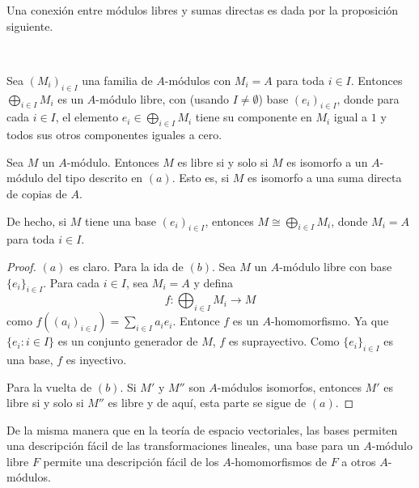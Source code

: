 Una conexión entre módulos libres y sumas directas es dada por la proposición siguiente.

\begin{proposition}~
  \begin{subtheorem}
    \item Sea $(M_i)_{i \in I}$ una familia de $A$-módulos con $M_i = A$ para toda $i \in I$. Entonces $\bigoplus_{i\in I} M_i$ es un $A$-módulo libre, con (usando $I \neq \emptyset$) base $(e_i)_{i \in I}$, donde para cada $i \in I$, el elemento $e_i \in \bigoplus_{i\in I} M_i$ tiene su componente en $M_i$ igual a $1$ y todos sus otros componentes iguales a cero.
    
    \item Sea $M$ un $A$-módulo. Entonces $M$ es libre si y solo si $M$ es isomorfo a un $A$-módulo del tipo descrito en $(a)$. Esto es, si $M$ es isomorfo a una suma directa de copias de $A$.
    
    De hecho, si $M$ tiene una base $(e_i)_{i \in I}$, entonces $M \cong \bigoplus_{i\in I} M_i$, donde $M_i = A$ para toda $i \in I$.
  \end{subtheorem}
\end{proposition}
\begin{proof}
  $(a)$ es claro. Para la ida de $(b)$. Sea $M$ un $A$-módulo libre con base $\{e_i\}_{i \in I}$. Para cada $i \in I$, sea $M_i =A$ y defina
    \[
      f\colon \bigoplus_{i \in I} M_i \to M
    \]
    como $f((a_i)_{i\in I}) = \sum_{i\in I} a_i e_i$. Entonce $f$ es un $A$-homomorfismo. Ya que $\{e_i : i \in I\}$ es un conjunto generador de $M$, $f$ es suprayectivo. Como $\{e_i\}_{i\in I}$ es una base, $f$ es inyectivo.

    Para la vuelta de $(b)$. Si $M'$ y $M''$ son $A$-módulos isomorfos, entonces $M'$ es libre si y solo si $M''$ es libre y de aquí, esta parte se sigue de $(a)$.
\end{proof}

De la misma manera que en la teoría de espacio vectoriales, las bases permiten una descripción fácil de las transformaciones lineales, una base para un $A$-módulo libre $F$ permite una descripción fácil de los $A$-homomorfismos de $F$ a otros $A$-módulos.

